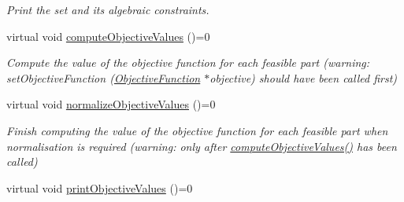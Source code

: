 \begin{DoxyCompactItemize}
\begin{DoxyCompactList}\small\item\em Print the set and its algebraic constraints. \end{DoxyCompactList}\item 
\hypertarget{classAbstractSet_a341945c465179a52da09356a2aa50a8d}{virtual void \hyperlink{classAbstractSet_a341945c465179a52da09356a2aa50a8d}{compute\-Objective\-Values} ()=0}\label{classAbstractSet_a341945c465179a52da09356a2aa50a8d}

\begin{DoxyCompactList}\small\item\em Compute the value of the objective function for each feasible part (warning\-: set\-Objective\-Function (\hyperlink{classObjectiveFunction}{Objective\-Function} $\ast$objective) should have been called first) \end{DoxyCompactList}\item 
\hypertarget{classAbstractSet_ae871ecbb69614c1028c3c688b90061b3}{virtual void \hyperlink{classAbstractSet_ae871ecbb69614c1028c3c688b90061b3}{normalize\-Objective\-Values} ()=0}\label{classAbstractSet_ae871ecbb69614c1028c3c688b90061b3}

\begin{DoxyCompactList}\small\item\em Finish computing the value of the objective function for each feasible part when normalisation is required (warning\-: only after \hyperlink{classAbstractSet_a341945c465179a52da09356a2aa50a8d}{compute\-Objective\-Values()} has been called) \end{DoxyCompactList}\item 
\hypertarget{classAbstractSet_a5589719db42d5fdf7f517b2e749f0675}{virtual void \hyperlink{classAbstractSet_a5589719db42d5fdf7f517b2e749f0675}{print\-Objective\-Values} ()=0}\label{classAbstractSet_a5589719db42d5fdf7f517b2e749f0675}


\end{DoxyCompactItemize}
